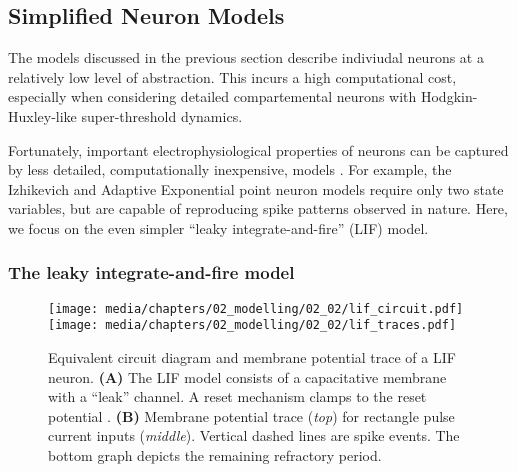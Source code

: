 
\newpage

\subsection{Simplified Neuron Models}
\label{sec:simplified_neuron_models}

The models discussed in the previous section describe indiviudal neurons at a relatively low level of abstraction.
This incurs a high computational cost, especially when considering detailed compartemental neurons with Hodgkin-Huxley-like super-threshold dynamics.

Fortunately, important electrophysiological properties of neurons can be captured by less detailed, computationally inexpensive, models \citep[cf.][Chapter~14]{koch1999biophysics}.
For example, the Izhikevich \citep{izhikevich2004which} and Adaptive Exponential \citep{brette2005adaptive} point neuron models require only two state variables, but are capable of reproducing spike patterns observed in nature.
Here, we focus on the even simpler \enquote{leaky integrate-and-fire} (LIF) model.

\subsubsection{The leaky integrate-and-fire model}

\begin{figure}[t]
	\texttt{[image: media/chapters/02\_modelling/02\_02/lif\_circuit.pdf]}%
	\kern-0.25cm\texttt{[image: media/chapters/02\_modelling/02\_02/lif\_traces.pdf]}
	\caption[Equivalent circuit diagram and membrane potential trace of a LIF neuron]{Equivalent circuit diagram and membrane potential trace of a LIF neuron. \textbf{(A)} The LIF model consists of a capacitative membrane with a \enquote{leak} channel. A reset mechanism clamps \vMem to the reset potential \vReset. \textbf{(B)} Membrane potential trace (\emph{top}) for rectangle pulse current inputs (\emph{middle}).  Vertical dashed lines are spike events. The bottom graph depicts the remaining refractory period.}
	\label{fig:lif}
\end{figure}

